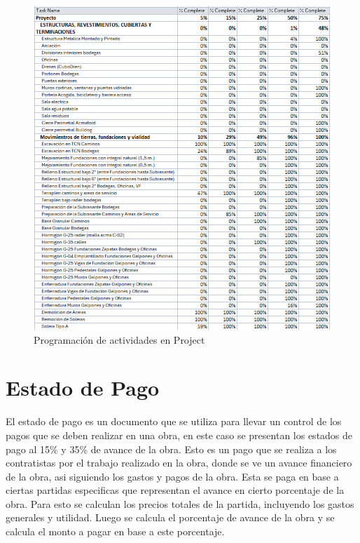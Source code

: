 \documentclass{article} %
\begin{document}
\begin{figure}[H]
    \centering
    \includegraphics[width=1\linewidth]{GRAFICOS/P1A.png}
    \caption{Programación de actividades en Project}
    \label{fig:programacion}
\end{figure}

\newpage
\section{Estado de Pago}

El estado de pago es un documento que se utiliza para llevar un control de los pagos que se deben realizar en una obra, en este caso se presentan los estados de pago al 15\% y 35\% de avance de la obra. Esto es un pago que se realiza a los contratistas por el trabajo realizado en la obra, donde se ve un avance financiero de la obra, asi siguiendo los gastos y pagos de la obra. Esta se paga en base a ciertas partidas especificas que representan el avance en cierto porcentaje de la obra. Para esto se calculan los precios totales de la partida, incluyendo los gastos generales y utilidad. Luego se calcula el porcentaje de avance de la obra y se calcula el monto a pagar en base a este porcentaje.
\end{document}
